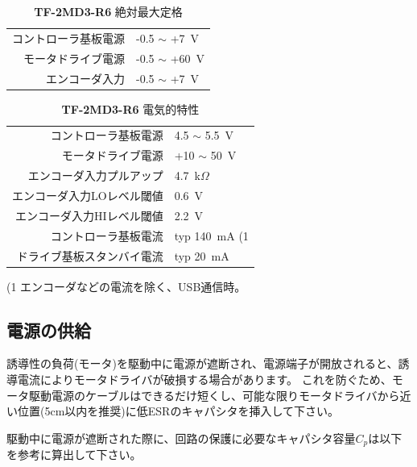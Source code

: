 \documentclass[11pt,a4j,openany,fleqn]{jbook}
\begin{document}
\begin{table}[H]
\caption{{\bf TF-2MD3-R6} 絶対最大定格}
\label{tb:abs_max6}
\centering\begin{tabular}{rl}
\toprule
コントローラ基板電源 & -0.5 $\sim$ +7~V \\
モータドライブ電源 & -0.5 $\sim$ +60~V \\
\midrule
エンコーダ入力 & -0.5 $\sim$ +7~V \\
\bottomrule
\end{tabular}
\end{table}

\begin{table}[H]
\caption{{\bf TF-2MD3-R6} 電気的特性}
\label{tb:el_char6}
\centering\begin{tabular}{rl}
\toprule
コントローラ基板電源 & 4.5 $\sim$ 5.5~V \\
モータドライブ電源 & +10 $\sim$ 50~V \\
\midrule
エンコーダ入力プルアップ & 4.7~k$\Omega$ \\
エンコーダ入力LOレベル閾値 & 0.6~V \\
エンコーダ入力HIレベル閾値 & 2.2~V \\
\midrule
コントローラ基板電流 & typ 140~mA {\footnotesize(1} \\
ドライブ基板スタンバイ電流 & typ 20~mA \\
\bottomrule
\end{tabular}
\begin{center}
{\footnotesize\centering (1 エンコーダなどの電流を除く、USB通信時。}
\end{center}
\end{table}

\newpage
\subsection{電源の供給}
\label{sec:電源の供給}

誘導性の負荷(モータ)を駆動中に電源が遮断され、電源端子が開放されると、誘導電流によりモータドライバが破損する場合があります。
これを防ぐため、モータ駆動電源のケーブルはできるだけ短くし、可能な限りモータドライバから近い位置(5cm以内を推奨)に低ESRのキャパシタを挿入して下さい。
\par
駆動中に電源が遮断された際に、回路の保護に必要なキャパシタ容量$C_{p}$は以下を参考に算出して下さい。
\par
\end{document}
